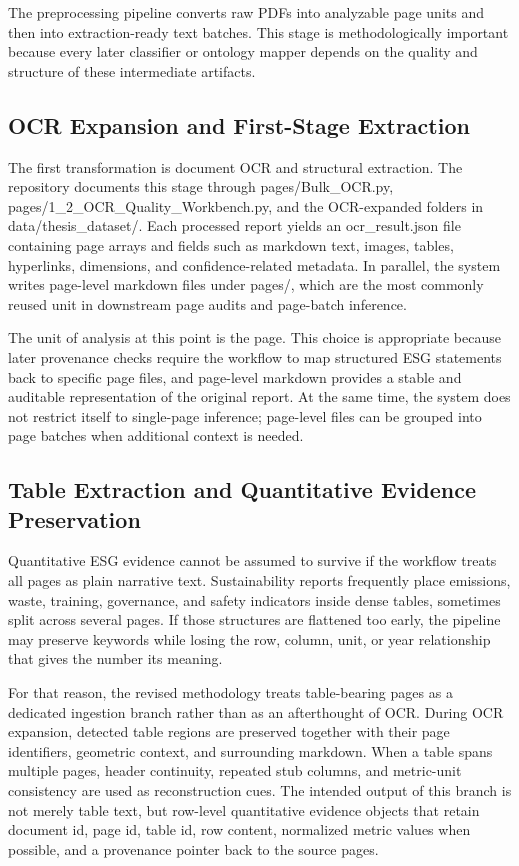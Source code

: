 The preprocessing pipeline converts raw PDFs into analyzable page units and then into extraction-ready text batches. This stage is methodologically important because every later classifier or ontology mapper depends on the quality and structure of these intermediate artifacts.

\subsection{OCR Expansion and First-Stage Extraction}

The first transformation is document OCR and structural extraction. The repository documents this stage through pages/Bulk\_OCR.py, pages/1\_2\_OCR\_Quality\_Workbench.py, and the OCR-expanded folders in data/thesis\_dataset/. Each processed report yields an ocr\_result.json file containing page arrays and fields such as markdown text, images, tables, hyperlinks, dimensions, and confidence-related metadata. In parallel, the system writes page-level markdown files under pages/, which are the most commonly reused unit in downstream page audits and page-batch inference.

The unit of analysis at this point is the page. This choice is appropriate because later provenance checks require the workflow to map structured ESG statements back to specific page files, and page-level markdown provides a stable and auditable representation of the original report. At the same time, the system does not restrict itself to single-page inference; page-level files can be grouped into page batches when additional context is needed.

\subsection{Table Extraction and Quantitative Evidence Preservation}

Quantitative ESG evidence cannot be assumed to survive if the workflow treats all pages as plain narrative text. Sustainability reports frequently place emissions, waste, training, governance, and safety indicators inside dense tables, sometimes split across several pages. If those structures are flattened too early, the pipeline may preserve keywords while losing the row, column, unit, or year relationship that gives the number its meaning.

For that reason, the revised methodology treats table-bearing pages as a dedicated ingestion branch rather than as an afterthought of OCR. During OCR expansion, detected table regions are preserved together with their page identifiers, geometric context, and surrounding markdown. When a table spans multiple pages, header continuity, repeated stub columns, and metric-unit consistency are used as reconstruction cues. The intended output of this branch is not merely table text, but row-level quantitative evidence objects that retain document id, page id, table id, row content, normalized metric values when possible, and a provenance pointer back to the source pages.

